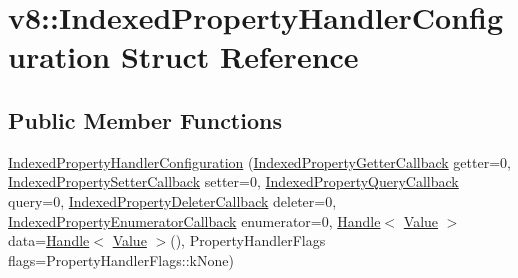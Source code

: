 \hypertarget{structv8_1_1_indexed_property_handler_configuration}{}\section{v8\+:\+:Indexed\+Property\+Handler\+Configuration Struct Reference}
\label{structv8_1_1_indexed_property_handler_configuration}
\subsection*{Public Member Functions}
\begin{DoxyCompactItemize}
\item 
\hyperlink{structv8_1_1_indexed_property_handler_configuration_a7a5eac48b07049cefccfc952fbd47613}{Indexed\+Property\+Handler\+Configuration} (\hyperlink{namespacev8_a48e7816ba64447bf32a25d194588daaf}{Indexed\+Property\+Getter\+Callback} getter=0, \hyperlink{namespacev8_a4ac7cc6185ebc8b6a199f9fa8e6bf5c3}{Indexed\+Property\+Setter\+Callback} setter=0, \hyperlink{namespacev8_a980b62c33eb664783e61e25c3b27f9ee}{Indexed\+Property\+Query\+Callback} query=0, \hyperlink{namespacev8_a53863728de14cde48dd6543207b2f2da}{Indexed\+Property\+Deleter\+Callback} deleter=0, \hyperlink{namespacev8_adbb0a6d5537371953f9ba807d4f6275e}{Indexed\+Property\+Enumerator\+Callback} enumerator=0, \hyperlink{classv8_1_1_local}{Handle}$<$ \hyperlink{classv8_1_1_value}{Value} $>$ data=\hyperlink{classv8_1_1_local}{Handle}$<$ \hyperlink{classv8_1_1_value}{Value} $>$(), Property\+Handler\+Flags flags=Property\+Handler\+Flags\+::k\+None)
\end{DoxyCompactItemize}
